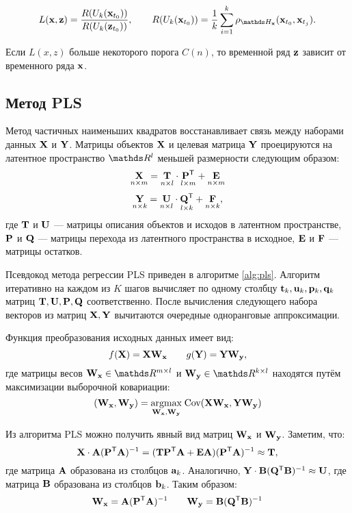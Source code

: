 \documentclass[a4paper, 12pt]{article}
\begin{document}
\begin{equation}
	L(\bx, \bz) = \dfrac{R(U_k(\bx_{t_0}))}{R(U_k(\bz_{t_0}))}, \qquad R(U_k(\bx_{t_0})) = \dfrac{1}{k} \sum\limits_{i=1}^k \rho_{\dH_{\bx}}(\bx_{t_0}, \bx_{t_j}).
\end{equation}

Если $L(x, z)$ больше некоторого порога $C(n)$, то временной ряд $\mathbf{z}$ зависит от временного ряда $\mathbf{x}$.


\subsection{Метод PLS}
Метод частичных наименьших квадратов восстанавливает связь между наборами данных $\mathbf{X}$ и $\mathbf{Y}$. 
Матрицы объектов $\mathbf{X}$ и целевая матрица $\mathbf{Y}$ проецируются на латентное пространство $\dR^l$ меньшей размерности следующим образом:
$$ \underset{n \times m}{\mathbf{X}} = \underset{n \times l}{\mathbf{T}} \cdot \underset{l \times m}{\mathbf{P}^{\mathsf{T}}} + \underset{n \times m}{\mathbf{E}} $$
$$ \underset{n \times k}{\mathbf{Y}} = \underset{n \times l}{\mathbf{U}} \cdot \underset{l \times k}{\mathbf{Q}^{\mathsf{T}}} + \underset{n \times k}{\mathbf{F}}, $$
где $\mathbf{T}$ и $\mathbf{U}$ --- матрицы описания объектов и исходов в латентном пространстве, $\mathbf{P}$ и $\mathbf{Q}$ --- матрицы перехода из латентного пространства в исходное, $\mathbf{E}$ и $\mathbf{F}$ --- матрицы остатков.

Псевдокод метода регрессии PLS приведен в алгоритме \ref{alg:pls}. Алгоритм итеративно на каждом из $K$ шагов вычисляет по одному столбцу $\mathbf{t}_k, \mathbf{u}_k, \mathbf{p}_k, \mathbf{q}_k$ матриц $\mathbf{T}, \mathbf{U}, \mathbf{P}, \mathbf{Q}$ соответственно. После вычисления следующего набора векторов из матриц $\mathbf{X}, \mathbf{Y}$ вычитаются очередные одноранговые аппроксимации.

Функция преобразования исходных данных имеет вид: 
$$ f(\mathbf{X}) = \mathbf{X}\mathbf{W}_{\mathbf{x}} \qquad g(\mathbf{Y}) = \mathbf{Y}\mathbf{W}_{\mathbf{y}}, $$ 
где матрицы весов $\bW_{\bx} \in \dR^{m \times l}$ и $\bW_{\by} \in \dR^{k \times l}$ находятся путём максимизации выборочной ковариации:
$$ (\mathbf{W}_{\mathbf{x}}, \mathbf{W}_{\mathbf{y}}) = \underset{\mathbf{W}_{\mathbf{x}}, \mathbf{W}_{\mathbf{y}}}{\text{argmax}}\; \text{Cov}(\mathbf{X}\mathbf{W}_{\mathbf{x}}, \mathbf{Y}\mathbf{W}_{\mathbf{y}})$$

Из алгоритма PLS можно получить явный вид матриц $\mathbf{W}_{\mathbf{x}}$ и $\mathbf{W}_{\mathbf{y}}$. Заметим, что:
$$ \mathbf{X} \cdot \mathbf{A}(\mathbf{P} ^{\mathsf{T}} \mathbf{A})^{-1} = (\mathbf{T} \mathbf{P} ^{\mathsf{T}} \mathbf{A} + \mathbf{E} \mathbf{A})(\mathbf{P} ^{\mathsf{T}} \mathbf{A})^{-1} \approx \mathbf{T}, $$
где матрица $\mathbf{A}$ образована из столбцов $\mathbf{a}_k$. Аналогично, $\mathbf{Y} \cdot \mathbf{B}(\mathbf{Q} ^{\mathsf{T}} \mathbf{B})^{-1} \approx \mathbf{U}$, где матрица $\mathbf{B}$ образована из столбцов $\mathbf{b}_k$. 
Таким образом:
$$ \mathbf{W}_{\mathbf{x}} = \mathbf{A}(\mathbf{P} ^{\mathsf{T}} \mathbf{A})^{-1} \qquad \mathbf{W}_{\mathbf{y}} = \mathbf{B}(\mathbf{Q} ^{\mathsf{T}} \mathbf{B})^{-1} $$
\end{document}
